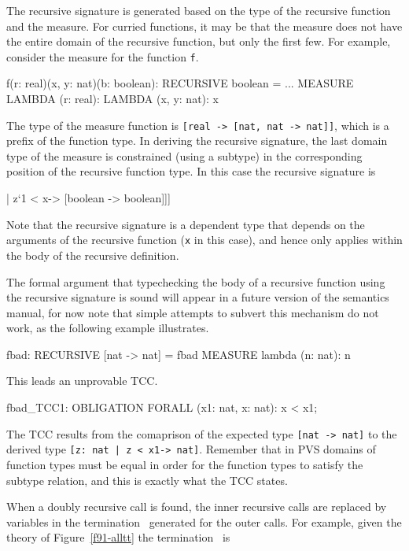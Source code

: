 The recursive signature is generated based on the type of the recursive
function and the measure.  For curried functions, it may be that the
measure does not have the entire domain of the recursive function, but
only the first few.  For example, consider the measure for the function
\texttt{f}.
\begin{pvsex}
  f(r: real)(x, y: nat)(b: boolean): RECURSIVE boolean
    = ...
   MEASURE LAMBDA (r: real): LAMBDA (x, y: nat): x
\end{pvsex}
The type of the measure function is \texttt{[real -> [nat, nat -> nat]]},
which is a prefix of the function type.  In deriving the recursive
signature, the last domain type of the measure is constrained (using a
subtype) in the corresponding position of the recursive function type.  In
this case the recursive signature is
\begin{pvsex}
  [real -> [\setb{}z: [nat, nat] | z`1 < x\sete -> [boolean -> boolean]]]
\end{pvsex}
Note that the recursive signature is a dependent type that depends on the
arguments of the recursive function (\texttt{x} in this case), and hence
only applies within the body of the recursive definition.

The formal argument that typechecking the body of a recursive function
using the recursive signature is sound will appear in a future version of
the semantics manual, for now note that simple attempts to subvert this
mechanism do not work, as the following example illustrates.
\begin{pvsex}
  fbad: RECURSIVE [nat -> nat] = fbad
   MEASURE lambda (n: nat): n
\end{pvsex}
This leads an unprovable TCC.
\begin{pvsex}
  fbad_TCC1: OBLIGATION FORALL (x1: nat, x: nat): x < x1;
\end{pvsex}
The TCC results from the comaprison of the expected type \texttt{[nat ->
nat]} to the derived type \texttt{[\setb{}z:\ nat | z < x1\sete -> nat]}.  Remember
that in PVS domains of function types must be equal in order for the
function types to satisfy the subtype relation, and this is exactly what
the TCC states.


When a doubly recursive call is found, the inner recursive calls are
replaced by variables in the termination \tccs\ generated for the outer
calls.  For example, given the theory of Figure~\ref{f91-alltt} the
termination \tcc\ is

